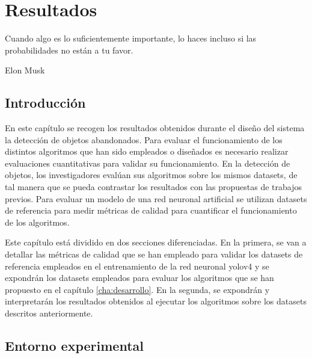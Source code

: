 
\chapter{Resultados}
\label{cha:resultados}

\begin{FraseCelebre}
  \begin{Frase}
    Cuando algo es lo suficientemente importante, lo haces incluso si las probabilidades no están a tu favor.
  \end{Frase}
  \begin{Fuente}
    Elon Musk
  \end{Fuente}
\end{FraseCelebre}

\section{Introducción}
\label{sec:intro-resultados}

En este capítulo se recogen los resultados obtenidos durante el diseño del sistema la detección de objetos abandonados. Para evaluar el funcionamiento de los distintos algoritmos que han sido empleados o diseñados es necesario realizar evaluaciones cuantitativas para validar su funcionamiento. En la detección de objetos, los investigadores evalúan sus algoritmos sobre los mismos datasets, de tal manera que se pueda contrastar los resultados con las propuestas de trabajos previos. Para evaluar un modelo de una red neuronal artificial se utilizan datasets de referencia para medir métricas de calidad para cuantificar el funcionamiento de los algoritmos.

Este capítulo está dividido en dos secciones diferenciadas. En la primera, se van a detallar las métricas de calidad que se han empleado para validar los datasets de referencia empleados en el entrenamiento de la red neuronal \gls{yolov4} y se expondrán los datasets empleados para evaluar los algoritmos que se han propuesto en el capítulo \ref{cha:desarrollo}. En la segunda, se expondrán y interpretarán los resultados obtenidos al ejecutar los algoritmos sobre los datasets descritos anteriormente.

\section{Entorno experimental}
\label{sec:desarrollo-resultados}

